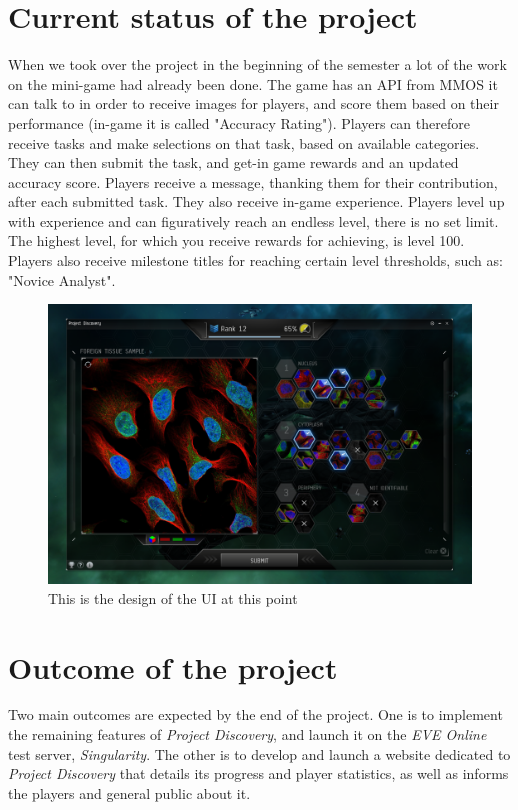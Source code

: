 \documentclass[11pt]{article}
\begin{document}
\section*{Current status of the project}

When we took over the project in the beginning of the semester a lot of the work on the mini-game had already been done.
The game has an API from MMOS it can talk to in order to receive images for players, and score them based on their performance (in-game it is called "Accuracy Rating"). Players can therefore receive tasks and make selections on that task, based on available categories. They can then submit the task, and get-in game rewards and an updated accuracy score. Players receive a message, thanking them for their contribution, after each submitted task. They also receive in-game experience. Players level up with experience and can figuratively reach an endless level, there is no set limit. The highest level, for which you receive rewards for achieving, is level 100. Players also receive milestone titles for reaching certain level thresholds, such as: "Novice Analyst".

\begin{figure}[H]
	\centering
    \includegraphics[width=15cm]{PD.png}
    \caption{\label{fig:PD}This is the design of the UI at this point}
\end{figure}

\section*{Outcome of the project}

Two main outcomes are expected by the end of the project. One is to implement the remaining features of \emph{Project Discovery}, and launch it on the \emph{EVE Online} test server, \emph{Singularity}. The other is to develop and launch a website dedicated to \emph{Project Discovery} that details its progress and player statistics, as well as informs the players and general public about it.\\
\end{document}
